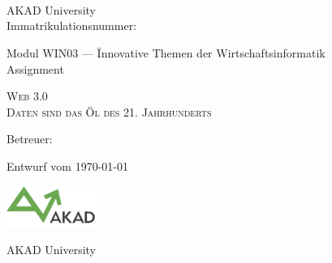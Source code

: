 

\begin{titlepage}


\vspace{5cm}

\Name \\ 
\Strasse \\ 
\PlzOrt\\ 
\href{mailto:\Email}{\Email}

AKAD University\\
Immatrikulationsnummer: \Immatrikulationsnummer

\vfill

\begin{tabbing}
Modul WIN03 --- \=Innovative Themen der Wirtschaftsinformatik\\ 
				\>Assignment
\end{tabbing}

\LARGE
\textsc{Web 3.0 \\Daten sind das Öl des 21. Jahrhunderts}\\

\vfill

\normalsize

Betreuer: \Betreuer

Entwurf vom \today %

\vfill

\includegraphics[width=3cm]{akad_logo.png}

AKAD University

\end{titlepage}

\normalsize
